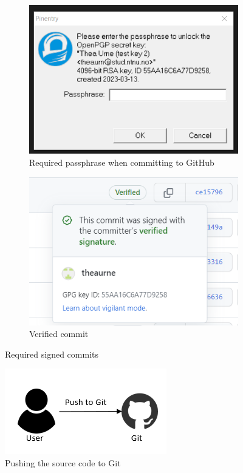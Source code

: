 \begin{figure}[H]
  \centering
  \begin{subfigure}[H]{0.4\textwidth}
    \includegraphics[width=\textwidth]{Images/signedcommits.png}
    \caption{Required passphrase when committing to GitHub}
    \label{fig:image1}
  \end{subfigure}
  \hfill
  \begin{subfigure}[H]{0.4\textwidth}
    \includegraphics[width=\textwidth]{Images/verified-commit.png}
    \caption{Verified commit}
    \label{fig:image2}
  \end{subfigure}
  \caption{Required signed commits}
  \label{fig:overall}
\end{figure}

\vspace{2mm}
\begin{figure}[H]
    \centering
    \includegraphics[width=0.5\columnwidth]{Images/aws-piplin-1.png}
    \caption{Pushing the source code to Git}
    \label{fig: Pushing the source code to Git}
\end{figure}


